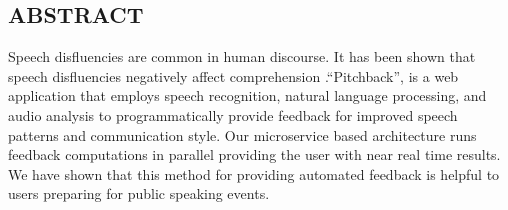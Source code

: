 \pagestyle{plain}
\begin{center}


\section*{ABSTRACT}


\end{center}
Speech disfluencies are common in human discourse. It has been shown that speech
disfluencies negatively affect comprehension \citep{corelystewart}.“Pitchback”,
is a web application that employs speech recognition, natural language
processing, and audio analysis to programmatically provide feedback for improved
speech patterns and communication style. Our microservice based architecture
runs feedback computations in parallel providing the user with near real time
results. We have shown that this method for providing automated feedback is
helpful to users preparing for public speaking events.

\cleardoublepage
